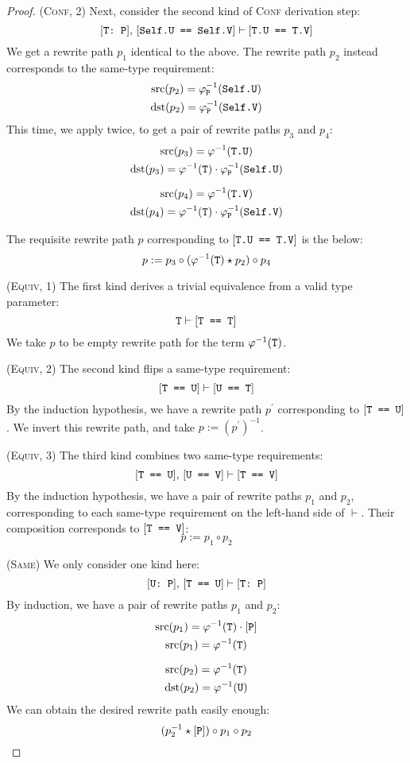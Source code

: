 \documentclass[../generics]{subfiles}
\begin{document}
\begin{proof}
(\textsc{Conf}, 2) Next, consider the second kind of \textsc{Conf} derivation step:
\[[\texttt{T:~P}],\,[\texttt{Self.U == Self.V}]\vdash[\texttt{T.U == T.V}]\]
We get a rewrite path $p_1$ identical to the above. The rewrite path $p_2$ instead corresponds to the same-type requirement:
\begin{gather*}
\operatorname{src}(p_2)=\varphi^{-1}_\texttt{P}(\texttt{Self.U})\\
\operatorname{dst}(p_2)=\varphi^{-1}_\texttt{P}(\texttt{Self.V})
\end{gather*}
This time, we apply  twice, to get a pair of rewrite paths $p_3$ and $p_4$:
\begin{gather*}
\operatorname{src}(p_3) = \varphi^{-1}(\texttt{T.U})\\
\operatorname{dst}(p_3) = \varphi^{-1}(\texttt{T})\cdot\varphi^{-1}_\texttt{P}(\texttt{Self.U})\\[\medskipamount]
\operatorname{src}(p_4) = \varphi^{-1}(\texttt{T.V})\\
\operatorname{dst}(p_4) = \varphi^{-1}(\texttt{T})\cdot\varphi^{-1}_\texttt{P}(\texttt{Self.V})
\end{gather*}

The requisite rewrite path $p$ corresponding to $[\texttt{T.U == T.V}]$ is the below:
\[p := p_3 \circ (\varphi^{-1}(\texttt{T}) \star p_2) \circ p_4\]

(\textsc{Equiv}, 1) The first kind derives a trivial equivalence from a valid type parameter:
\[\texttt{T}\vdash[\texttt{T == T}]\]
We take $p$ to be empty rewrite path for the term $\varphi^{-1}(\texttt{T})$.

(\textsc{Equiv}, 2) The second kind flips a same-type requirement:
\[[\texttt{T == U}]\vdash[\texttt{U == T}]\]
By the induction hypothesis, we have a rewrite path $p^\prime$ corresponding to $[\texttt{T == U}]$. We invert this rewrite path, and take $p := (p^\prime)^{-1}$.

(\textsc{Equiv}, 3) The third kind combines two same-type requirements:
\[[\texttt{T == U}],\,[\texttt{U == V}]\vdash[\texttt{T == V}]\]
By the induction hypothesis, we have a pair of rewrite paths $p_1$ and $p_2$, corresponding to each same-type requirement on the left-hand side of $\vdash$. Their composition corresponds to $[\texttt{T == V}]$:
\[p:=p_1\circ p_2\]

(\textsc{Same}) We only consider one kind here:
\[[\texttt{U:~P}],\,[\texttt{T == U}]\vdash[\texttt{T:~P}]\]
By induction, we have a pair of rewrite paths $p_1$ and $p_2$:
\begin{gather*}
\operatorname{src}(p_1)=\varphi^{-1}(\texttt{T})\cdot[\texttt{P}]\\
\operatorname{src}(p_1)=\varphi^{-1}(\texttt{T})\\[\medskipamount]
\operatorname{src}(p_2)=\varphi^{-1}(\texttt{T})\\
\operatorname{dst}(p_2)=\varphi^{-1}(\texttt{U})
\end{gather*}
We can obtain the desired rewrite path easily enough:
\[(p_2^{-1} \star [\texttt{P}]) \circ p_1 \circ p_2\]


\end{proof}
\end{document}
